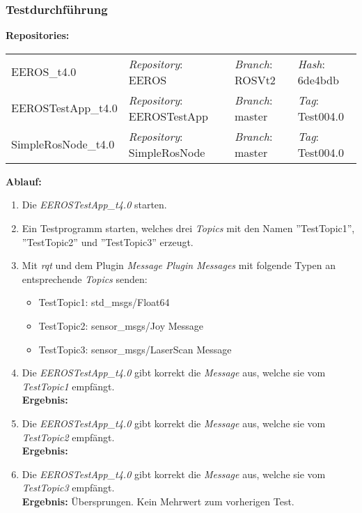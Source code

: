 \subsubsection{Testdurchführung}
\textbf{Repositories:} \\
\begin{tabular}
  { l						| l			 									l								 l								}

  EEROS\_t4.0				& \textit{Repository}: EEROS			& \textit{Branch}: ROSVt2		& \textit{Hash}: 6de4bdb 		\\
  EEROSTestApp\_t4.0		& \textit{Repository}: EEROSTestApp	& \textit{Branch}: master		& \textit{Tag}: Test004.0 		\\
  SimpleRosNode\_t4.0		& \textit{Repository}: SimpleRosNode	& \textit{Branch}: master		& \textit{Tag}: Test004.0 		\\
\end{tabular}

\textbf{Ablauf: }
\begin{enumerate}
\item Die \textit{EEROSTestApp\_t4.0} starten.
\item Ein Testprogramm starten, welches drei \textit{Topics} mit den Namen ''TestTopic1'', ''TestTopic2'' und ''TestTopic3'' erzeugt.
\item Mit \textit{rqt} und dem Plugin \textit{Message Plugin} \textit{Messages} mit folgende Typen an entsprechende \textit{Topics} senden:
  \begin{itemize}
  \item TestTopic1:	std\_msgs/Float64
  \item TestTopic2:	sensor\_msgs/Joy Message
  \item TestTopic3:	sensor\_msgs/LaserScan Message
  \end{itemize}
\item Die \textit{EEROSTestApp\_t4.0} gibt korrekt die \textit{Message} aus, welche sie vom \textit{TestTopic1} empfängt. \\
\textbf{Ergebnis:} \checkmark
\item Die \textit{EEROSTestApp\_t4.0} gibt korrekt die \textit{Message} aus, welche sie vom \textit{TestTopic2} empfängt. \\
\textbf{Ergebnis:} \checkmark
\item Die \textit{EEROSTestApp\_t4.0} gibt korrekt die \textit{Message} aus, welche sie vom \textit{TestTopic3} empfängt. \\
\textbf{Ergebnis:} Übersprungen. Kein Mehrwert zum vorherigen Test.
\end{enumerate}






